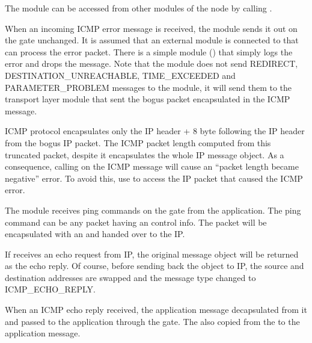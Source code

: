 The  module can be accessed from other modules of the node by calling
.

When an incoming ICMP error message is received, the  module
sends it out on the  gate unchanged. It is assumed that an
external module is connected to  that can process the error
packet. There is a simple module () that simply
logs the error and drops the message. Note that the  module
does not send REDIRECT, DESTINATION\_UNREACHABLE,
TIME\_EXCEEDED and PARAMETER\_PROBLEM messages to the  module,
it will send them to the transport layer module that sent the bogus
packet encapsulated in the ICMP message.
\begin{note}
ICMP protocol encapsulates only the IP header + 8 byte following the IP header
from the bogus IP packet. The ICMP packet length computed from this truncated
packet, despite it encapsulates the whole IP message object.
As a consequence, calling  on the ICMP message
will cause an ``packet length became negative'' error. To avoid this,
use  to access the IP packet that caused the ICMP
error.
\end{note}

The  module receives ping commands on the 
gate from the application. The ping command can be any packet
having an  control info. The packet
will be encapsulated with an  and
handed over to the IP.

If  receives an echo request from IP, the original
message object will be returned as the echo reply. Of course,
before sending back the object to IP, the source and destination
addresses are swapped and the message type changed to ICMP\_ECHO\_REPLY.

When an ICMP echo reply received, the application message decapsulated
from it and passed to the application through the  gate.
The  also copied from the 
to the application message.


\fi


